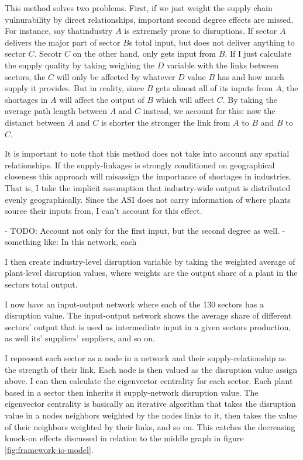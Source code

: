 \documentclass[11pt]{article}
\begin{document}
This method solves two problems. First, if we just weight the supply chain vulnurability by direct relationships, important second degree effects are missed. For instance, say thatindustry $A$ is extremely prone to disruptions. If sector $A$ delivers the major part of sector $B$s total input, but does not deliver anything to sector $C$. Secotr $C$ on the other hand, only gets input from $B$. If I just calculate the supply quality by taking weighing the $D$ variable with the links between sectors, the $C$ will only be affected by whatever $D$ value $B$ has and how much supply it provides. But in reality, since $B$ gets almost all of its inputs from $A$, the shortages in $A$ will affect the output of $B$ which will affect $C$. By taking the average path length between $A$ and $C$ instead, we account for this: now the distanct between $A$ and $C$ is shorter the stronger the link from $A$ to $B$ and $B$ to $C$. 

It is important to note that this method does not take into account any spatial relationships. If the supply-linkages is strongly conditioned on geographical closeness this approach will misassign the importance of shortages in industries. That is, I take the implicit assumption that industry-wide output is distributed evenly geographically. Since the ASI does not carry information of where plants source their inputs from, I can't account for this effect.


- TODO: Account not only for the first input, but the second degree as well. - something like: In this network, each


I then create industry-level disruption variable by taking the weighted average of plant-level disruption values, where weights are the output share of a plant in the sectors total output. 

I now have an input-output network where each of the 130 sectors has a disruption value. The input-output network shows the average share of different sectors' output that is used as intermediate input in a given sectors production, as well its' suppliers' suppliers, and so on.

I represent each sector as a node in a network and their supply-relationship as the strength of their link. Each node is then valued as the disruption value assign above. I can then calculate the eigenvector centrality for each sector. Each plant based in a sector then inherits it supply-network disruption value. The eigenvector centrality is basically an iterative algorithm that takes the disruption value in a nodes neighbors weighted by the nodes links to it, then takes the value of their neighbors weighted by their links, and so on. This catches the decreasing knock-on effects discussed in relation to the middle graph in figure \ref{fig:framework-io-model}.
\end{document}
